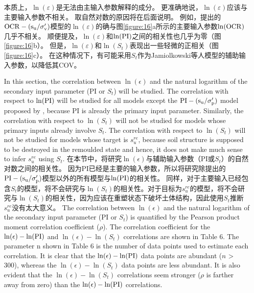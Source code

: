 \begin{paracol}{2}
\begin{Parallel}{0.60\textwidth}{}
{    }
    \ParallelRText
    {
        本质上，$\ln(\varepsilon)$是无法由主输入参数解释的成分。 更准确地说，$\ln(\varepsilon)$应该与主要输入参数不相关。 取自然对数的原因将在后面说明。 例如，\citet{Jamiolkowski198557}提出的$\rm{OCR}-(s_u/\sigma_v')$模型的$\ln(\varepsilon)$的确与图\ref{figure:16}a所示的主要输入参数$\ln(\rm{OCR})$几乎不相关。 顺便提及，$\ln(\varepsilon)$和$\ln(\rm{PI})$之间的相关性也几乎为零（图\ref{figure:16}b）。 但是，$\ln(\varepsilon)$和$\ln(S_t)$表现出一些轻微的正相关（图\ref{figure:16}c）。 在这种情况下，有可能采用$S_t$作为Jamiolkowski等人模型的辅助输入参数，以降低其COV。
    }
    \ParallelPar
    
    \ParallelLText
    {
        In this section, the correlation between $\ln(\epsilon)$ and the natural logarithm of the secondary input parameter (PI or $S_t$) will be  studied. The correlation with respect to $\ln(\rm{PI})$ will be studied for all models except the $\rm{PI}-(s_u/\sigma_p')$ model proposed by \citet{Mesri1975409, Mesri1989162}, because PI is already the primary input parameter. Similarly, the correlation with respect to $\ln(S_t)$ will not be studied for models whose primary inputs already involve $S_t$. The correlation with respect to $\ln(S_t)$ will not be studied for models whose target is $s_u^{re}$, because soil structure is supposed to be destroyed in the  remoulded state and hence, it does not make much sense to infer $s_u^{re}$ using $S_t$.
    }
    \ParallelRText
    {
        在本节中，将研究$\ln(\epsilon)$与辅助输入参数（PI或$S_t$）的自然对数之间的相关性。 因为PI已经是主要的输入参数，所以将研究除\citet{Mesri1975409, Mesri1989162}提出的$\rm{PI}-(s_u/\sigma_p')$模型以外的所有模型与$\ln(\rm{PI})$的相关性。 同样，对于主要输入已经包含$S_t$的模型，将不会研究与$\ln(S_t)$的相关性。对于目标为$s_u^{re}$的模型，将不会研究与$\ln(S_t)$的相关性，因为应该在重塑状态下破坏土体结构，因此使用$S_t$推断$s_u^{re}$没有太大意义。
    }
    \ParallelPar
    \ParallelLText
    {
        The correlation between $\ln(\epsilon)$ and the natural logarithm of the secondary input parameter (PI or $S_t$) is quantified by the Pearson product moment correlation coefficient ($\rho$). The correlation coefficient for the $\ln(\epsilon)-\ln(\rm{PI})$ and $\ln(\epsilon)-\ln(S_t)$ correlations are shown in Table 6. The parameter n shown in Table 6 is the number of data points used to estimate each correlation. It is clear that the $\ln(\epsilon)-\ln(\rm{PI})$ data points are abundant ($n$ > 300), whereas the $\ln(\epsilon)-\ln(S_t)$ data points are less abundant. It is also evident that the $\ln(\epsilon)-\ln(S_t)$ correlations seem stronger ($\rho$ is farther away from zero) than the $\ln(\epsilon)-\ln(\rm{PI})$ correlations.
}
\end{Parallel}
\end{paracol}
